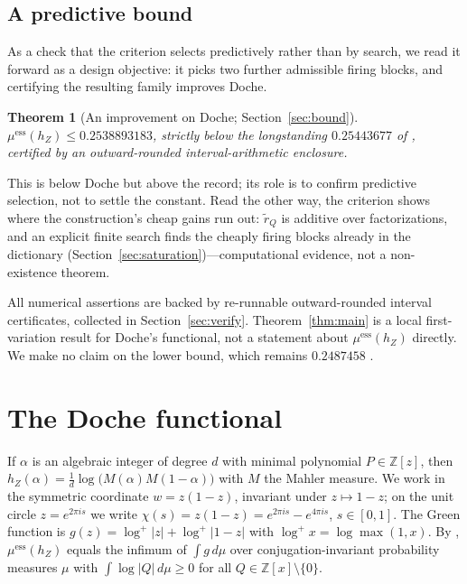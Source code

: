 \documentclass[11pt,reqno]{amsart}
\theoremstyle{plain}
\newtheorem{theorem}{Theorem}
\theoremstyle{definition}
\newcommand{\Z}{\mathbb{Z}}
\newcommand{\hZ}{h_Z}
\newcommand{\essmin}{\mu^{\mathrm{ess}}(\hZ)}
\begin{document}
\subsection*{A predictive bound} As a check that the criterion selects predictively
rather than by search, we read it forward as a design objective: it picks two further
admissible firing blocks, and certifying the resulting family improves Doche.

\begin{theorem}[An improvement on Doche; Section~\ref{sec:bound}]\label{thm:upper}
$\essmin\le 0.2538893183$, strictly below the longstanding $0.25443677$ of
\citet{Doc01b}, certified by an outward-rounded interval-arithmetic enclosure.
\end{theorem}

This is below Doche but above the record; its role is to confirm predictive selection,
not to settle the constant. Read the other way, the criterion shows where the
construction's cheap gains run out: $\widetilde r_Q$ is additive over factorizations, and
an explicit finite search finds the cheaply firing blocks already in the dictionary
(Section~\ref{sec:saturation})---computational evidence, not a non-existence theorem.

All numerical assertions are backed by re-runnable outward-rounded interval
certificates, collected in Section~\ref{sec:verify}. Theorem~\ref{thm:main} is a local
first-variation result for Doche's functional, not a statement about $\essmin$ directly.
We make no claim on the lower bound, which remains $0.2487458$ \citep{F18}.

\section{The Doche functional}\label{sec:functional}

If $\alpha$ is an algebraic integer of degree $d$ with minimal polynomial
$P\in\Z[z]$, then $\hZ(\alpha)=\frac1d\log\bigl(M(\alpha)M(1-\alpha)\bigr)$ with $M$
the Mahler measure. We work in the symmetric coordinate $w=z(1-z)$, invariant under
$z\mapsto1-z$; on the unit circle $z=e^{2\pi is}$ we write
$\chi(s)=z(1-z)=e^{2\pi is}-e^{4\pi is}$, $s\in[0,1]$. The Green function is
$g(z)=\log^+|z|+\log^+|1-z|$ with $\log^+x=\log\max(1,x)$. By
\citet[Thm.~6.5]{BMQS}, $\essmin$ equals the infimum of $\int g\,d\mu$ over
conjugation-invariant probability measures $\mu$ with $\int\log|Q|\,d\mu\ge0$ for all
$Q\in\Z[x]\setminus\{0\}$.
\end{document}
